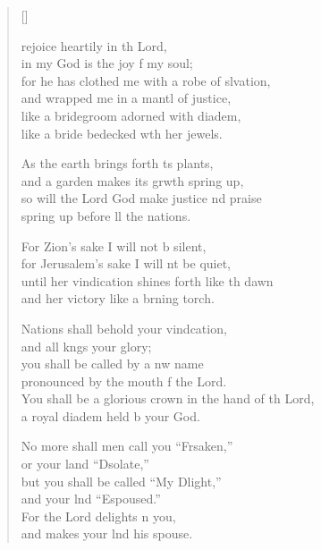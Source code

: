 \settowidth{\versewidth}{You shall be a glorious crown in the hand of the Lord, *}
\begin{verse}[\versewidth]
  \begin{patverse}
 rejoice heartily in th Lord,\Med\\
in my God is the joy f my soul;\\
for he has clothed me with a robe of slvation,\Med\\
and wrapped me in a mantl of justice,\\
like a bridegroom adorned with  diadem,\Med\\
like a bride bedecked w\pointup{\i}th her jewels.

As the earth brings forth \pointup{\i}ts plants,\Med\\
and a garden makes its grwth spring up,\\
so will the Lord God make justice nd praise\Med\\
spring up before ll the nations.

For Zion’s sake I will not b silent,\Med\\
for Jerusalem’s sake I will nt be quiet,\\
until her vindication shines forth like th dawn\Med\\
and her victory like a brning torch.

Nations shall behold your vind\pointup{\i}cation,\Med\\
and all k\pointup{\i}ngs your glory;\\
you shall be called by a nw name\Med\\
pronounced by the mouth f the Lord.\\
You shall be a glorious crown in the hand of th Lord,\Med\\
a royal diadem held b your God.

No more shall men call you “Frsaken,”\Med\\
or your land “Dsolate,”\\
but you shall be called “My Dlight,”\Med\\
and your lnd “Espoused.”\\
For the Lord delights \pointup{\i}n you,\Med\\
and makes your lnd his spouse.


\end{patverse}
\end{verse}
